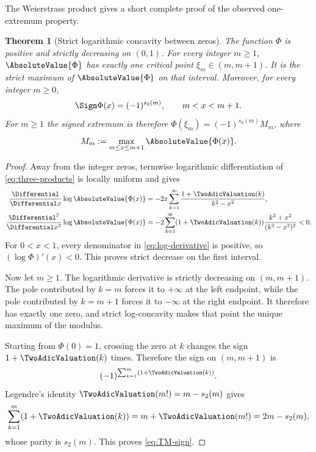 \documentclass[11pt,oneside]{article}
\newtheorem{theorem}{Theorem}[section]
\theoremstyle{definition}
\theoremstyle{remark}
\newcommand{\Phiup}{\Phi}
\begin{document}
The Weierstrass product gives a short complete proof of the observed one-extremum property.

\begin{theorem}[Strict logarithmic concavity between zeros]
\label{thm:unique-extremum}
The function $\Phiup$ is positive and strictly decreasing on $(0,1)$.  For every integer
$m\ge1$, $\AbsoluteValue{\Phiup}$ has exactly one critical point
$\xi_m\in(m,m+1)$.  It is the strict maximum of $\AbsoluteValue{\Phiup}$ on that interval.  Moreover,
for every integer $m\ge0$,
\begin{equation}
 \Sign\Phiup(x)=(-1)^{s_2(m)},\qquad m<x<m+1.
 \label{eq:TM-sign}
\end{equation}
For $m\ge1$ the signed extremum is therefore
$\Phiup(\xi_m)=(-1)^{s_2(m)}M_m$, where
\[
 M_m:=\max_{m\le x\le m+1}\AbsoluteValue{\Phiup(x)}.
\]
\end{theorem}

\begin{proof}
Away from the integer zeros, termwise logarithmic differentiation of
\eqref{eq:three-products} is locally uniform and gives
\begin{align}
 \frac{\Differential}{\Differential x}\log\AbsoluteValue{\Phiup(x)}
 &=-2x\sum_{k=1}^{\infty}\frac{1+\TwoAdicValuation(k)}{k^2-x^2},
 \label{eq:log-derivative}\\
 \frac{\Differential^2}{\Differential x^2}\log\AbsoluteValue{\Phiup(x)}
 &=-2\sum_{k=1}^{\infty}(1+\TwoAdicValuation(k))
   \frac{k^2+x^2}{(k^2-x^2)^2}<0.
 \label{eq:strict-log-concavity}
\end{align}
For $0<x<1$, every denominator in \eqref{eq:log-derivative} is positive, so
$(\log\Phiup)'(x)<0$.  This proves strict decrease on the first interval.

Now let $m\ge1$.  The logarithmic derivative is strictly decreasing on $(m,m+1)$.
The pole contributed by $k=m$ forces it to $+\infty$ at the left endpoint, while the pole
contributed by $k=m+1$ forces it to $-\infty$ at the right endpoint.  It therefore has
exactly one zero, and strict log-concavity makes that point the unique maximum of the modulus.

Starting from $\Phiup(0)=1$, crossing the zero at $k$ changes the sign
$1+\TwoAdicValuation(k)$ times.  Therefore the sign on $(m,m+1)$ is
\[
 (-1)^{\sum_{k=1}^{m}(1+\TwoAdicValuation(k))}.
\]
Legendre's identity $\TwoAdicValuation(m!)=m-s_2(m)$ gives
\[
 \sum_{k=1}^{m}(1+\TwoAdicValuation(k))=m+\TwoAdicValuation(m!)=2m-s_2(m),
\]
whose parity is $s_2(m)$.  This proves \eqref{eq:TM-sign}.
\end{proof}
\end{document}
